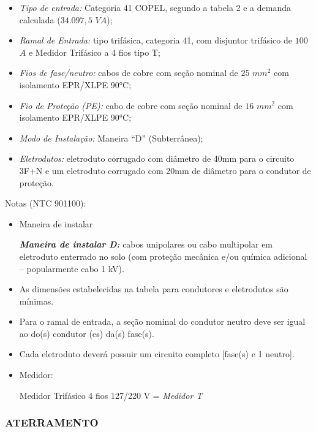 \begin{itemize}
	\item \textit{Tipo de entrada:} Categoria 41 COPEL, segundo a tabela 2 e a demanda calculada ($34.097,5$ $VA$);
	\item \textit{Ramal de Entrada:} tipo trifásica, categoria 41, com disjuntor trifásico de $100$ $A$ e Medidor Trifásico a 4 fios tipo T;
	\item \textit{Fios de fase/neutro:} cabos de cobre com seção nominal de $25$ $mm^2$ com isolamento EPR/XLPE 90°C;
	\item \textit{Fio de Proteção (PE):} cabo de cobre com seção nominal de $16$ $mm^2$ com isolamento EPR/XLPE 90°C;
	\item \textit{Modo de Instalação:} Maneira ``D'' (Subterrânea);
	\item \textit{Eletrodutos: } eletroduto corrugado com diâmetro de 40mm para o circuito 3F+N e um eletroduto corrugado com 20mm de diâmetro para o condutor de proteção.
\end{itemize}

Notas (NTC 901100): 

\begin{itemize}

	\item Maneira de instalar

	\subitem  \textit{\textbf{Maneira de instalar D:}} cabos unipolares ou cabo multipolar em eletroduto enterrado no solo (com proteção mecânica e/ou química adicional – popularmente cabo 1 kV).
	
	\item As dimensões estabelecidas na tabela para condutores e eletrodutos são mínimas.

	\item Para o ramal de entrada, a seção nominal do condutor neutro deve ser igual ao do(s) condutor (es) da(s) fase(s).

	\item Cada eletroduto deverá possuir um circuito completo [fase(s) e 1 neutro].

	\item Medidor:

	\subitem Medidor Trifásico 4 fios 127/220 V = \textit{Medidor T}
	
\end{itemize}


\subsubsection{ATERRAMENTO}

